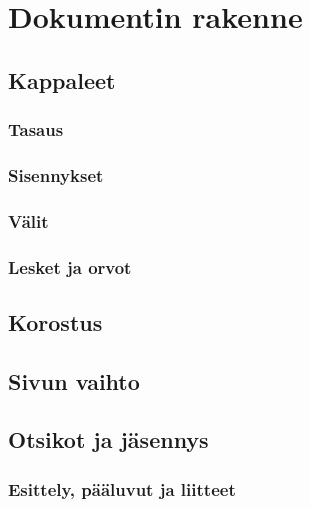 \chapter{Dokumentin rakenne}
\section{Kappaleet}
\label{luku:kappale}

\subsection{Tasaus}
\subsection{Sisennykset}
\subsection{Välit}


\subsection{Lesket ja orvot}
\section{Korostus}
\section{Sivun vaihto}
\section{Otsikot ja jäsennys}
\label{luku:otsikot}

%

\subsection{Esittely, pääluvut ja liitteet}
\label{luku:frontmainbackmatter}

